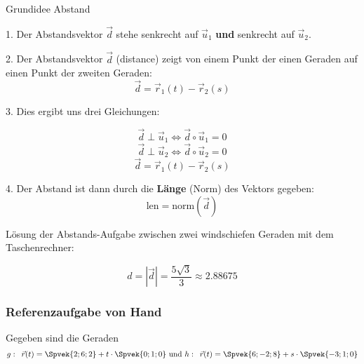 \begin{rezept}{Grundidee Abstand}{}

  1. Der Abstandsvektor $\vec{d}$ stehe senkrecht auf $\vec{u}_1$
  \textbf{und} senkrecht auf $\vec{u}_2$.

  2. Der Abstandsvektor $\vec{d}$ (distance) zeigt von einem Punkt der einen Geraden auf
  einen Punkt der zweiten Geraden: $$\vec{d}=\vec{r}_1(t) - \vec{r}_2(s)$$

  3. Dies ergibt uns drei Gleichungen:

  $$\vec{d}\perp\vec{u}_1 \Longleftrightarrow{}  \vec{d}\circ{}\vec{u}_1 = 0$$
  $$\vec{d}\perp\vec{u}_2 \Longleftrightarrow{}  \vec{d}\circ{}\vec{u}_2 = 0$$
  $$\vec{d}=\vec{r}_1(t)-\vec{r}_2(s)$$

  4. Der Abstand ist dann durch die \textbf{Länge} (Norm) des Vektors gegeben:
  $$\text{len} = \text{norm}(\vec{d})$$
  
\end{rezept}
\newpage


Lösung der Abstands-Aufgabe zwischen zwei windschiefen Geraden mit dem
Taschenrechner:
\TRAINER{}


$$d = |\vec{d} | = \frac{5\sqrt{3}}{3} \approx 2.88675$$
\newpage
\subsubsection*{Referenzaufgabe von Hand}

Gegeben sind die Geraden
$$g: \,\,\, \vec{r}(t) = \Spvek{2;6;2} + t\cdot{}\Spvek{0;1;0} \text{
  und }  h: \,\,\, \vec{r}(t) = \Spvek{6;-2;8} + s\cdot{}\Spvek{-3;1;0} $$


